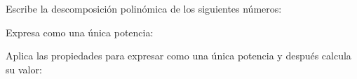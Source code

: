 \documentclass[addpoints,spanish, 12pt,a4paper]{exam}
\renewcommand*\half{.5}
\begin{document}
\begin{questions}




\question[1\half]  Escribe la descomposición polinómica de los siguientes números:


\question[1\half] Expresa como una única potencia:
\begin{multicols}{3}
\end{multicols}



\question[2] Aplica las propiedades para expresar como una única potencia y después calcula su valor:
\begin{multicols}{2}
\begin{parts}

\end{parts}
\end{multicols}
\end{questions}
\end{document}
